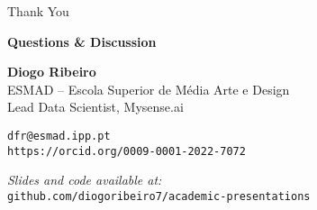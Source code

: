 \documentclass[aspectratio=169,11pt]{beamer}
\begin{document}
\begin{frame}
\begin{center}
{\Huge Thank You}

\vspace{0.8cm}

\textbf{Questions \& Discussion}

\vspace{1cm}

\textbf{Diogo Ribeiro}\\
ESMAD -- Escola Superior de Média Arte e Design\\
Lead Data Scientist, Mysense.ai\\

\vspace{0.5cm}

\texttt{dfr@esmad.ipp.pt}\\
\texttt{https://orcid.org/0009-0001-2022-7072}

\vspace{0.8cm}

\textit{Slides and code available at:}\\
\texttt{github.com/diogoribeiro7/academic-presentations}
\end{center}
\end{frame}
\end{document}

